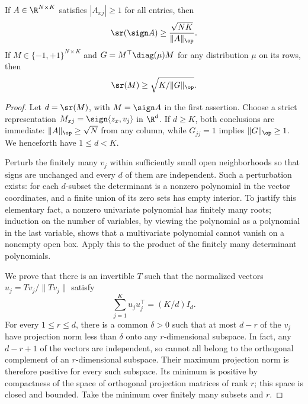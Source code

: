 \begin{theorem}\label{thm:forster}
If $A\in\R^{N\times K}$ satisfies $|A_{xj}|\geq1$ for all entries, then
\begin{equation}\label{eq:forster}
 \sr(\sign A)\geq\frac{\sqrt{NK}}{\|A\|_\op}.
\end{equation}
If $M\in\{-1,+1\}^{N\times K}$ and $G=M^\top\diag(\mu)M$ for any distribution $\mu$ on its rows, then
\begin{equation}\label{eq:weighted}
 \sr(M)\geq\sqrt{K/\|G\|_\op}.
\end{equation}
\end{theorem}
\begin{proof}
Let $d=\sr(M)$, with $M=\sign A$ in the first assertion. Choose a strict representation
$M_{xj}=\sign\langle z_x,v_j\rangle$ in $\R^d$. If $d\geq K$, both conclusions are immediate: $\|A\|_\op\geq\sqrt N$ from any column, while $G_{jj}=1$ implies $\|G\|_\op\geq1$. We henceforth have $1\leq d<K$.

Perturb the finitely many $v_j$ within sufficiently small open neighborhoods so that signs are unchanged and every $d$ of them are independent. Such a perturbation exists: for each $d$-subset the determinant is a nonzero polynomial in the vector coordinates, and a finite union of its zero sets has empty interior. To justify this elementary fact, a nonzero univariate polynomial has finitely many roots; induction on the number of variables, by viewing the polynomial as a polynomial in the last variable, shows that a multivariate polynomial cannot vanish on a nonempty open box. Apply this to the product of the finitely many determinant polynomials.

We prove that there is an invertible $T$ such that the normalized vectors
$u_j=Tv_j/\|Tv_j\|$ satisfy
\begin{equation}\label{eq:isotropy}
 \sum_{j=1}^K u_ju_j^\top=(K/d)I_d.
\end{equation}
For every $1\leq r\leq d$, there is a common $\delta>0$ such that at most $d-r$ of the $v_j$ have projection norm less than $\delta$ onto any $r$-dimensional subspace. In fact, any $d-r+1$ of the vectors are independent, so cannot all belong to the orthogonal complement of an $r$-dimensional subspace. Their maximum projection norm is therefore positive for every such subspace. Its minimum is positive by compactness of the space of orthogonal projection matrices of rank $r$; this space is closed and bounded. Take the minimum over finitely many subsets and $r$.


\end{proof}
